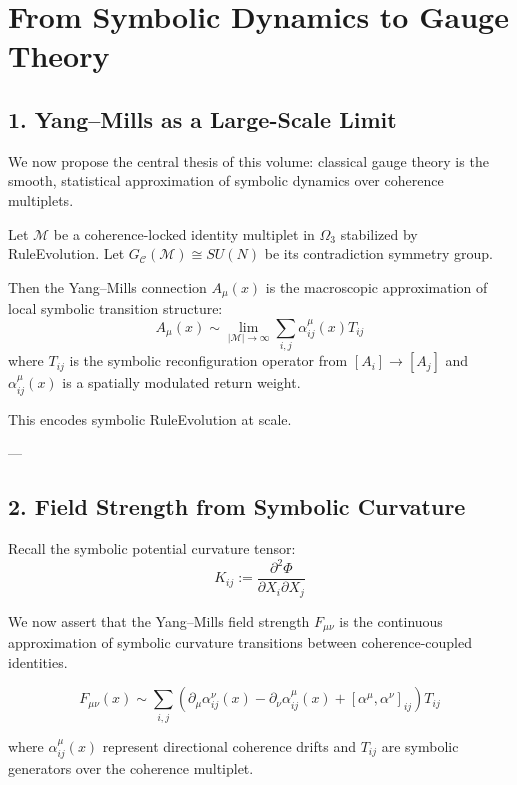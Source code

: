 \chapter{From Symbolic Dynamics to Gauge Theory} \label{chapter-gauge-emergence}

\section{1. Yang–Mills as a Large-Scale Limit} \label{sec:ym-limit}

We now propose the central thesis of this volume: classical gauge theory is the smooth, statistical approximation of symbolic dynamics over coherence multiplets.

\begin{definition}
Let $\mathcal{M}$ be a coherence-locked identity multiplet in $\Omega_3$ stabilized by RuleEvolution. Let $G_\mathcal{C}(\mathcal{M}) \cong SU(N)$ be its contradiction symmetry group.

Then the Yang–Mills connection $A_\mu(x)$ is the macroscopic approximation of local symbolic transition structure:
\[
A_\mu(x) \sim \lim_{|\mathcal{M}| \to \infty} \sum_{i,j} \alpha_{ij}^\mu(x) T_{ij}
\]
where $T_{ij}$ is the symbolic reconfiguration operator from $[A_i] \to [A_j]$ and $\alpha_{ij}^\mu(x)$ is a spatially modulated return weight.
\end{definition}

This encodes symbolic RuleEvolution at scale.

---

\section{2. Field Strength from Symbolic Curvature} \label{sec:field-strength-symbolic}

Recall the symbolic potential curvature tensor:
\[
K_{ij} := \frac{\partial^2 \Phi}{\partial X_i \partial X_j}
\]

We now assert that the Yang–Mills field strength $F_{\mu\nu}$ is the continuous approximation of symbolic curvature transitions between coherence-coupled identities.

\begin{proposition}
\[
F_{\mu\nu}(x) \sim \sum_{i,j} \left( \partial_\mu \alpha_{ij}^\nu(x) - \partial_\nu \alpha_{ij}^\mu(x) + [\alpha^\mu, \alpha^\nu]_{ij} \right) T_{ij}
\]

\noindent where $\alpha_{ij}^\mu(x)$ represent directional coherence drifts and $T_{ij}$ are symbolic generators over the coherence multiplet.
\end{proposition}

